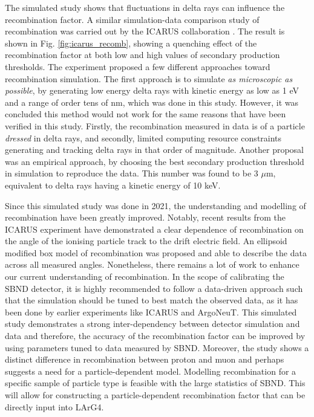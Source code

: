 The simulated study shows that fluctuations in delta rays can influence the recombination factor.
A similar simulation-data comparison study of recombination was carried out by the ICARUS collaboration \cite{icarus_recomb}.
The result is shown in Fig. \ref{fig:icarus_recomb}, showing a quenching effect of the recombination factor at both low and high values of secondary production thresholds.
The experiment proposed a few different approaches toward recombination simulation.
The first approach is to simulate \textit{as microscopic as possible}, by generating low energy delta rays with kinetic energy as low as 1 eV and a range of order tens of nm, which was done in this study.
However, it was concluded this method would not work for the same reasons that have been verified in this study.
Firstly, the recombination measured in data is of a particle \textit{dressed} in delta rays, and secondly, limited computing resource constraints generating and tracking delta rays in that order of magnitude.
Another proposal was an empirical approach, by choosing the best secondary production threshold in simulation to reproduce the data.
This number was found to be 3 $\mu$m, equivalent to delta rays having a kinetic energy of 10 keV.


Since this simulated study was done in 2021, the understanding and modelling of recombination have been greatly improved.
Notably, recent results from the ICARUS experiment \cite{} have demonstrated a clear dependence of recombination on the angle of the ionising particle track to the drift electric field. 
An ellipsoid modified box model of recombination was proposed and able to describe the data across all measured angles. 
Nonetheless, there remains a lot of work to enhance our current understanding of recombination.
In the scope of calibrating the SBND detector, it is highly recommended to follow a data-driven approach such that the simulation should be tuned to best match the observed data, as it has been done by earlier experiments like ICARUS and ArgoNeuT.
This simulated study demonstrates a strong inter-dependency between detector simulation and data and therefore, the accuracy of the recombination factor can be improved by using parameters tuned to data measured by SBND.
Moreover, the study shows a distinct difference in recombination between proton and muon and perhaps suggests a need for a particle-dependent model.
Modelling recombination for a specific sample of particle type is feasible with the large statistics of SBND. 
This will allow for constructing a particle-dependent recombination factor that can be directly input into LArG4.
